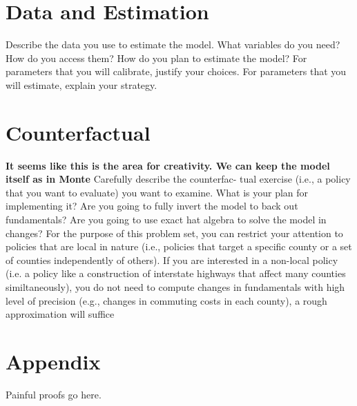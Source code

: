 \documentclass{article}
\begin{document}
\section{Data and Estimation}
\label{sec:data}
Describe the data you use to estimate the model. What
variables do you need? How do you access them? How do you plan to estimate the
model? For parameters that you will calibrate, justify your choices. For parameters
that you will estimate, explain your strategy.

\section{Counterfactual}
\textbf{It seems like this is the area for creativity. We can keep the model itself as in Monte}
\label{sec:counterfactual}
Carefully describe the counterfac-
tual exercise (i.e., a policy that you want to evaluate) you want to examine. What is your plan for implementing it? Are you going to fully invert the model to back out
fundamentals? Are you going to use exact hat algebra to solve the model in changes?
For the purpose of this problem set, you can restrict your attention to policies that
are local in nature (i.e., policies that target a specific county or a set of counties
independently of others). If you are interested in a non-local policy (i.e. a policy like a
construction of interstate highways that affect many counties similtaneously), you do
not need to compute changes in fundamentals with high level of precision (e.g., changes
in commuting costs in each county), a rough approximation will suffice

\section{Appendix}
Painful proofs go here.


\end{document}
